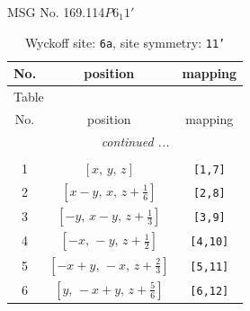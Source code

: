 \documentclass[fleqn,8pt]{jsarticle}
\begin{document}
\setcounter{MaxMatrixCols}{32}

\renewcommand{\tablename}{Table~}
\renewcommand{\figurename}{Figure~}
\begin{center}
\LARGE
MSG No. 169.114\quad$P6_{1}1'$
\end{center}
\renewcommand{\arraystretch}{1.2}
\begin{longtable}{ccc}
\caption{Wyckoff site: {\tt 6a}, site symmetry: {\tt 11'}}
 \\
 \hline \hline
No. & position & mapping \\ \hline \endfirsthead

\multicolumn{2}{l}{\tablename\ \thetable{}} \\
 \hline \hline
No. & position & mapping \\ \hline \endhead

 \hline \hline
\multicolumn{2}{r}{\footnotesize\it continued ...} \\ \endfoot

 \hline \hline
\multicolumn{2}{r}{} \\ \endlastfoot

1 & $\left[ x,\, y,\, z \right]$ & {\tt [1,7]} \\ \hline
2 & $\left[ x - y,\, x,\, z + \frac{1}{6} \right]$ & {\tt [2,8]} \\ \hline
3 & $\left[ - y,\, x - y,\, z + \frac{1}{3} \right]$ & {\tt [3,9]} \\ \hline
4 & $\left[ - x,\, - y,\, z + \frac{1}{2} \right]$ & {\tt [4,10]} \\ \hline
5 & $\left[ - x + y,\, - x,\, z + \frac{2}{3} \right]$ & {\tt [5,11]} \\ \hline
6 & $\left[ y,\, - x + y,\, z + \frac{5}{6} \right]$ & {\tt [6,12]} \\
\end{longtable}
\end{document}
